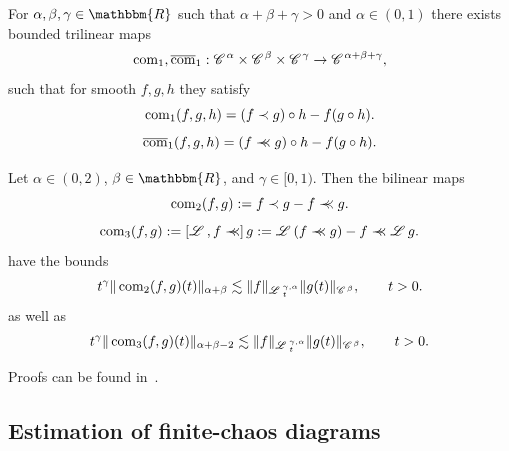 \begin{appendices}
\begin{lemma}
  \begin{enumeratealpha}
    \item For $\alpha, \beta, \gamma \in \mathbbm{R}$ such that $\alpha +
    \beta + \gamma > 0$ and $\alpha \in (0, 1)$ there exists bounded trilinear
    maps
    \[ \operatorname{com}_1, \overline{\operatorname{com}}_1 : \mathscr{C} \hspace{.1em}^{\alpha} \times
       \mathscr{C} \hspace{.1em}^{\beta} \times \mathscr{C} \hspace{.1em}^{\gamma} \rightarrow \mathscr{C} \hspace{.1em}^{\alpha + \beta +
       \gamma}, \]
    such that for smooth $f, g, h$ they satisfy
    \begin{equation}
      \operatorname{com}_1 (f, g, h) = (f \prec g) \circ h - f (g \circ h) .
      \label{e:firstcomm-nonsmooth}
    \end{equation}
    \begin{equation}
      \overline{\operatorname{com}}_1 (f, g, h) = (f \prec\!\!\!\prec g) \circ h - f (g \circ
      h) . \label{e:firstcomm}
    \end{equation}
    \item Let $\alpha \in (0, 2)$, $\beta \in \mathbbm{R}$, and $\gamma \in
    [0, 1)$. Then the bilinear maps
    \begin{equation}
      \operatorname{com}_2 (f, g) : = f \prec g - f \prec\!\!\!\prec g. \label{e:secondcomm}
    \end{equation}
    \begin{equation}
      \tmop{com}_3 (f, g) : = \left[ \LL, f \precprec \right] g \assign \LL (f
      \precprec g) - f \precprec \LL g. \label{e:thirdcomm}
    \end{equation}
    have the bounds
    \begin{equation}
      t^{\gamma} \| \operatorname{com}_2 (f, g) (t) \|_{\alpha + \beta} \lesssim \| f
      \|_{\mathscr{L} \hspace{.2em}^{\gamma, \alpha}_t} \| g (t) \|_{\mathscr{C} \hspace{.1em}^{\beta}}, \qquad t > 0.
      \label{eq:bound-second-comm}
    \end{equation}
    as well as
    \begin{equation}
      t^{\gamma} \| \operatorname{com}_3 (f, g) (t) \|_{\alpha + \beta - 2} \lesssim
      \| f \|_{\mathscr{L} \hspace{.2em}^{\gamma, \alpha}_t} \| g (t) \|_{\mathscr{C} \hspace{.1em}^{\beta}}, \qquad t >
      0. \label{eq:bound-third-comm}
    \end{equation}
  \end{enumeratealpha}
\end{lemma}

Proofs can be found in~{\cite{gubinelli_kpz_2017}}.

\subsection{\label{a:ker-est}Estimation of finite-chaos diagrams}


\end{appendices}
